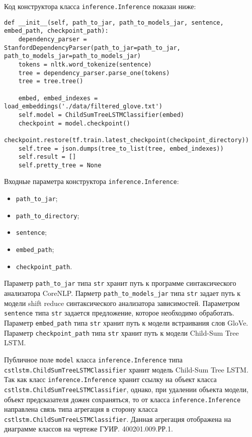 Код конструктора класса \texttt{inference.Inference} показан ниже:

\medskip
\begin{lstlisting}[style=Python]
  def __init__(self, path_to_jar, path_to_models_jar, sentence, embed_path, checkpoint_path):
    dependency_parser = StanfordDependencyParser(path_to_jar=path_to_jar, path_to_models_jar=path_to_models_jar)
    tokens = nltk.word_tokenize(sentence)
    tree = dependency_parser.parse_one(tokens)
    tree = tree.tree()

    embed, embed_indexes = load_embeddings('./data/filtered_glove.txt')
    self.model = ChildSumTreeLSTMClassifier(embed)
    checkpoint = model.checkpoint()
    checkpoint.restore(tf.train.latest_checkpoint(checkpoint_directory))
    self.tree = json.dumps(tree_to_list(tree, embed_indexes))
    self.result = []
    self.pretty_tree = None
\end{lstlisting}
\medskip

Входные параметра конструктора \texttt{inference.Inference}:
\begin{itemize}
\item \texttt{path\_to\_jar};
\item \texttt{path\_to\_directory};
\item \texttt{sentence};
\item \texttt{embed\_path};
\item \texttt{checkpoint\_path}.
\end{itemize}

Параметр \texttt{path\_to\_jar} типа \texttt{str} хранит путь к программе синтаксического анализатора CoreNLP\@. Парметр \texttt{path\_to\_models\_jar} типа \texttt{str} задает путь к модели shift reduce синтаксического анализатора зависимостей. Параметром \texttt{sentence} типа \texttt{str} задается предложение, которое необходимо обработать. Параметр \texttt{embed\_path} типа \texttt{str} хранит путь к модели встраивания слов GloVe. Параметр \texttt{checkpoint\_path} типа \texttt{str} хранит путь к модели Child-Sum Tree LSTM\@.

Публичное поле \texttt{model} класса \texttt{inference.Inference} типа \texttt{cstlstm.Ch\-ildSumTreeLSTMClassifier} хранит модель Child-Sum Tree LSTM\@. Так как класс \texttt{inference.Inference} хранит ссылку на объект класса \texttt{cstlstm.Child\-SumTreeLSTMClassifier}, однако, при удалении объекта модели, объект предсказателя дожен сохраняться, то от класса \texttt{inference.Inference} направлена связь типа агрегация в сторону класса \texttt{cstlstm.ChildSumTreeLSTMClassifi\-er}. Данная агрегация отображена на диаграмме классов на чертеже ГУИР. 400201.009.РР.1.

